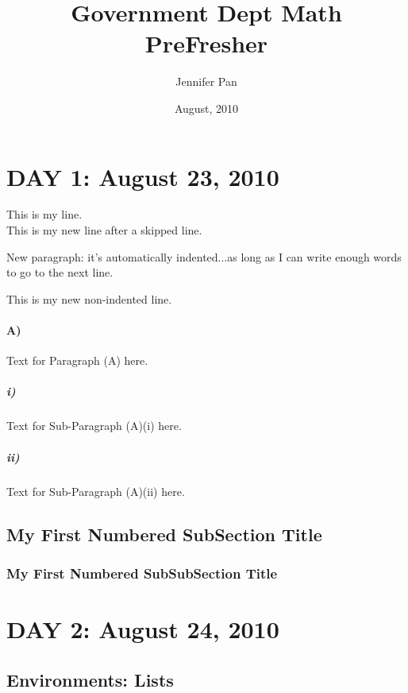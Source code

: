 \documentclass[10pt]{article}
\title{Government Dept Math PreFresher}
\author{Jennifer Pan}
\date{August, 2010}
\begin{document}

\maketitle

\section*{DAY 1: August 23, 2010}

This is my line. \\

This is my new line after a skipped line.

New paragraph: it's automatically indented...as long as I can write enough words to go to the next line.

\noindent This is my new non-indented line.

\paragraph{A)} Text for Paragraph (A) here.

\subparagraph{i)} Text for Sub-Paragraph (A)(i) here.

\subparagraph{ii)} Text for Sub-Paragraph (A)(ii) here.

\subsection{My First Numbered SubSection Title}

\subsubsection{My First Numbered SubSubSection Title}

\section*{DAY 2: August 24, 2010}

\subsection*{Environments: Lists}
\end{document}
